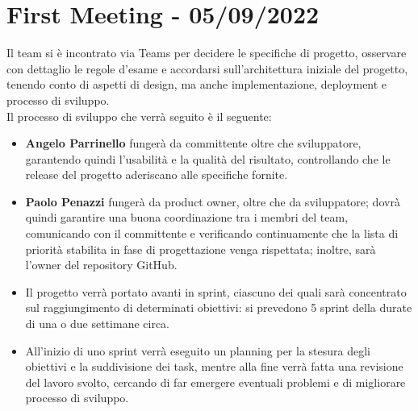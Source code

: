 \section*{First Meeting - 05/09/2022}
Il team si è incontrato via Teams per decidere le specifiche di progetto, osservare con dettaglio le regole d'esame e
accordarsi sull'architettura iniziale del progetto, tenendo conto di aspetti di design, ma anche implementazione,
deployment e processo di sviluppo.\\
Il processo di sviluppo che verrà seguito è il seguente:
\begin{itemize}
    \item \textbf{Angelo Parrinello} fungerà da committente oltre che sviluppatore, garantendo quindi l'usabilità e la qualità del risultato, controllando che le release del progetto aderiscano alle specifiche fornite.
    \item \textbf{Paolo Penazzi} fungerà da product owner, oltre che da sviluppatore; dovrà quindi garantire una buona coordinazione tra i membri del team, comunicando con il committente e verificando continuamente che la lista di priorità stabilita in fase di progettazione venga rispettata; inoltre, sarà l'owner del repository GitHub.
    \item Il progetto verrà portato avanti in sprint, ciascuno dei quali sarà concentrato sul raggiungimento di determinati obiettivi: si prevedono 5 sprint della durate di una o due settimane circa.
    \item All'inizio di uno sprint verrà eseguito un planning per la stesura degli obiettivi e la suddivisione dei task, mentre alla fine verrà fatta una revisione del lavoro svolto, cercando di far emergere eventuali problemi e di migliorare processo di sviluppo.
\end{itemize}

\newpage
